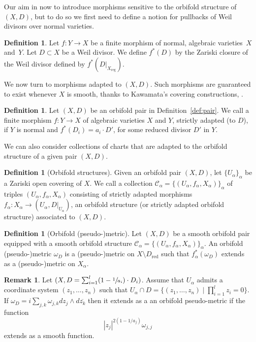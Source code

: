 \documentclass[JEP,XML,SOM,Unicode]{cedram}
\let\mathcal\mathscr
\theoremstyle{plain}
\theoremstyle{definition}
\newtheorem{definition}[theorem]{Definition}
\newtheorem{remark}[theorem]{Remark}
\numberwithin{equation}{theorem}
\DeclareMathOperator{\reg}{reg}
\begin{document}
Our aim in now to introduce morphisms sensitive to the orbifold structure of $(X,D)$, but to do so
we first need to define a notion for pullbacks of Weil divisors over normal varieties.

\begin{definition}\label{def:pullback}
Let $f: Y\to X$ be a finite morphism of normal, algebraic varieties~$X$ and~$Y$.
Let $D\subset X$ be a Weil divisor. We define
$f^*(D)$ by the Zariski closure of the Weil divisor defined by $f^*(D|_{X_{\reg}})$.
\end{definition}

We now turn to morphisms adapted to $(X,D)$. Such morphisms are guaranteed to
exist whenever $X$ is smooth, thanks to Kawamata's covering constructions,
\cf \cite[Prop.\,4.1.12]{Laz04-I}.

\begin{definition}\label{def:adapted}
Let $(X,D)$ be an orbifold pair in Definition~\ref{def:pair}. We call a finite morphism
$f: Y \to X$ of algebraic varieties $X$ and $Y$, strictly adapted (to $D$), if $Y$ is normal and
$f^*(D_i) = a_i \cdot D'$, for some reduced divisor $D'$ in $Y$.
\end{definition}

We can also consider collections of charts that are adapted to the orbifold
structure of a given pair $(X,D)$.

\begin{definition}[Orbifold structures]\label{def:structure}
Given an orbifold pair $(X,D)$, let $\{ U_{\alpha}\}_{\alpha}$ be a Zariski open covering of $X$.
We call a collection $\mathcal C_{\alpha} = \{ (U_{\alpha}, f_{\alpha}, X_{\alpha} )\}_{\alpha}$
of triples $(U_{\alpha}, f_{\alpha}, X_{\alpha})$
consisting of strictly adapted morphisms $f_{\alpha}: X_{\alpha} \to (U_{\alpha}, D|_{U_{\alpha}})$,
an orbifold structure (or strictly adapted orbifold structure) associated to $(X,D)$.
\end{definition}

\begin{definition}[Orbifold (pseudo-)metric]
Let $(X,D)$ be a smooth orbifold pair equipped with a smooth orbifold structure
$\mathcal C_{\alpha} = \{ (U_{\alpha}, f_{\alpha}, X_{\alpha}) \}_{\alpha}$. An orbifold (pseudo-)metric $\omega_D$ is a (pseudo-)metric on $X\setminus D_{\text{red}}$ such that $f_{\alpha}^*(\omega_D)$ extends as a (pseudo-)metric on $X_\alpha$.
\end{definition}

\begin{remark}
Let $(X, D =\sum_{i=1}^l (1-\sfrac{1}{a_i})\cdot D_i)$. Assume that $U_{\alpha}$ admits a coor\-dinate system $(z_1, \ldots, z_n)$ such that $U_{\alpha}\cap D = \{ (z_1, \ldots, z_n) \mid \prod_{i=1}^l z_i =0 \}$. If $\omega_D=i\sum_{j,k} \omega_{j,k} dz_j \wedge d\overline{z_k}$ then it extends as a an orbifold pseudo-metric if the function $$|z_j|^{2(1-1/a_j)}\omega_{j,j}$$ extends as a smooth function.
\end{remark}
\end{document}
